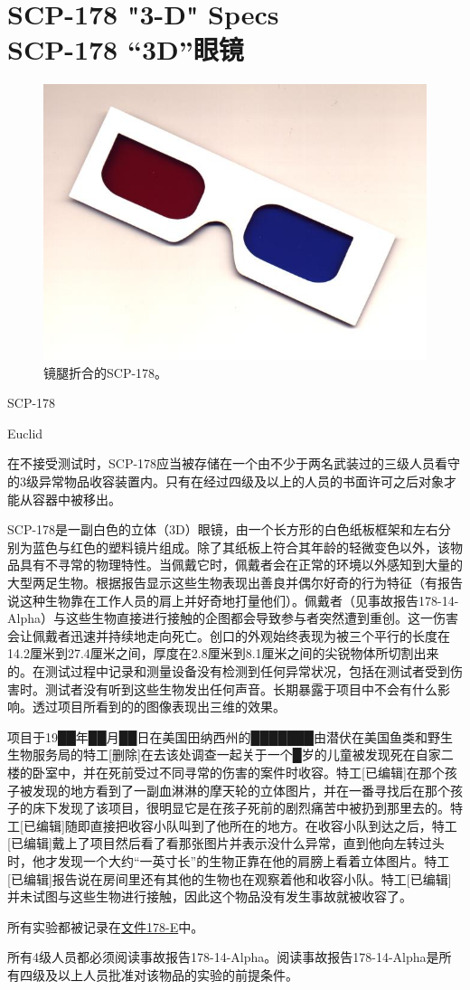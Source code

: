 \chapter[SCP-178 “3D”眼镜]{
    SCP-178 "3-D" Specs\\
    SCP-178 “3D”眼镜
}

\label{chap:SCP-178}

\begin{figure}[H]
    \centering
    \includegraphics[width=0.5\linewidth]{images/SCP-178.jpg}
    \caption*{镜腿折合的SCP-178。}
\end{figure}

SCP-178

Euclid

在不接受测试时，SCP-178应当被存储在一个由不少于两名武装过的三级人员看守的3级异常物品收容装置内。只有在经过四级及以上的人员的书面许可之后对象才能从容器中被移出。

SCP-178是一副白色的立体（3D）眼镜，由一个长方形的白色纸板框架和左右分别为蓝色与红色的塑料镜片组成。除了其纸板上符合其年龄的轻微变色以外，该物品具有不寻常的物理特性。当佩戴它时，佩戴者会在正常的环境以外感知到大量的大型两足生物。根据报告显示这些生物表现出善良并偶尔好奇的行为特征（有报告说这种生物靠在工作人员的肩上并好奇地打量他们）。佩戴者（见事故报告178-14-Alpha）与这些生物直接进行接触的企图都会导致参与者突然遭到重创。这一伤害会让佩戴者迅速并持续地走向死亡。创口的外观始终表现为被三个平行的长度在14.2厘米到27.4厘米之间，厚度在2.8厘米到8.1厘米之间的尖锐物体所切割出来的。在测试过程中记录和测量设备没有检测到任何异常状况，包括在测试者受到伤害时。测试者没有听到这些生物发出任何声音。长期暴露于项目中不会有什么影响。透过项目所看到的的图像表现出三维的效果。

项目于19██年██月██日在美国田纳西州的███████由潜伏在美国鱼类和野生生物服务局的特工{[}删除]在去该处调查一起关于一个█岁的儿童被发现死在自家二楼的卧室中，并在死前受过不同寻常的伤害的案件时收容。特工{[}已编辑]在那个孩子被发现的地方看到了一副血淋淋的摩天轮的立体图片，并在一番寻找后在那个孩子的床下发现了该项目，很明显它是在孩子死前的剧烈痛苦中被扔到那里去的。特工{[}已编辑]随即直接把收容小队叫到了他所在的地方。在收容小队到达之后，特工{[}已编辑]戴上了项目然后看了看那张图片并表示没什么异常，直到他向左转过头时，他才发现一个大约“一英寸长”的生物正靠在他的肩膀上看着立体图片。特工{[}已编辑]报告说在房间里还有其他的生物也在观察着他和收容小队。特工{[}已编辑]并未试图与这些生物进行接触，因此这个物品没有发生事故就被收容了。

所有实验都被记录在\hyperref[sec:DOC-scp-178-log]{文件178-E}中。

所有4级人员都必须阅读事故报告178-14-Alpha。阅读事故报告178-14-Alpha是所有四级及以上人员批准对该物品的实验的前提条件。\\

\newpage
